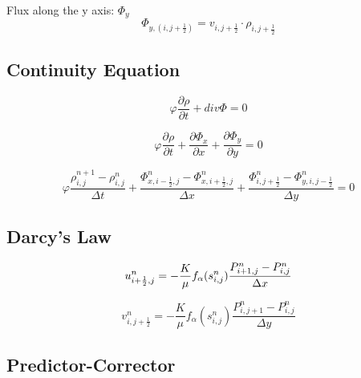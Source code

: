\documentclass[a4paper,12pt]{article}
\begin{document}
Flux along the y axis: \(\Phi_y\)
\[
    \Phi_{y, (i, j + \frac{1}{2})} = v_{i, j + \frac{1}{2}} \cdot
    \rho_{i, j + \frac{1}{2}}
\] 

\subsection{Continuity Equation}

\[
\varphi \frac{\partial \rho}{\partial t}
+ div \Phi = 0
\] 

\[
\varphi \frac{\partial \rho}{\partial t}
+ \frac{\partial \Phi_x}{\partial x}
+ \frac{\partial \Phi_y}{\partial y} = 0
\] 

\[
\varphi \frac{\rho^{n + 1}_{i, j} - \rho^n_{i, j}}{\Delta t}
+ \frac{\Phi_{x, i - \frac{1}{2}, j}^n -
        \Phi_{x, i + \frac{1}{2},j}^n}{\Delta x}
+ \frac{\Phi_{i, j + \frac{1}{2}}^n - \Phi_{y, i, j - \frac{1}{2}}^n}
{\Delta y} = 0
\] 

\subsection{Darcy's Law}

\[
    u_{i + \frac{1}{2} , j}^n = -\frac{K}{\mu} f_\alpha (s_{i, j}^n)
    \frac{P_{i + 1, j}^n - P_{i, j}^n}{\Delta x} \\
\] 

\[
    v_{i, j + \frac{1}{2}}^n = -\frac{K}{\mu} f_\alpha(s_{i, j}^n)
    \frac{P_{i, j + 1}^n - P_{i, j}^n}{\Delta y}
\] 

% 
% 

\subsection{Predictor-Corrector}
\end{document}

